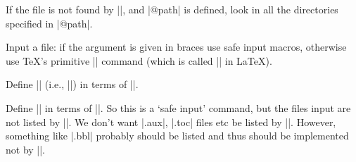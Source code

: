\begin{multicols}
 \begin{macro}{\@iffileonpath}
 \end{macro}
 If the file is not found by |\openin|, and |@path| is defined,
 look in all the directories specified in |@path|.

    \begin{teX}
\long\def\@iffileonpath#1{%
  \let\reserved@a\@secondoftwo
  \expandafter\@tfor\expandafter\reserved@b\expandafter
             :\expandafter=@path\do{%
    \openin\@inputcheck\reserved@b#1 %
    \ifeof\@inputcheck\else
      \edef\@filef@und{\reserved@b#1 }%
      \let\reserved@a\@firstoftwo%
      \closein\@inputcheck
      \@break@tfor
    \fi}%
  \reserved@a}
    \end{teX}



    \begin{teX}
\long{}
    \end{teX}


  \begin{macro}{}
    Input a file: if the argument is given in braces use safe input
    macros, otherwise use \TeX's primitive || command (which is
    called |\@@input| in \LaTeX).
  \end{macro}

    \begin{teX}
\def
    \end{teX}


 \begin{macro}{\@iinput}
    Define |\@iinput| (i.e., ||) in terms of
    |\InputIfIfileExists|.
 \end{macro}
    \begin{teX}
\def\@iinput#1{%
  \InputIfFileExists{#1}{}%
  {\filename@parse{#1}%
   \edef\reserved@a{\noexpand\@missingfileerror
     {\filename@area\filename@base}%
     {\ifx\filename@ext\relax tex\else\filename@ext\fi}}%
   \reserved@a}}
    \end{teX}


 \begin{macro}{\@input}
    Define |\@input| in terms of |\IffileExists|.
    So this is a `safe input' command, but the files input are not
    listed by |\listfiles|.
    We don't want |.aux|, |.toc| files etc be listed by |\listfiles|.
    However, something like |.bbl| probably should be listed and thus
    should be implemented not by |\@input|.
 \end{macro}
    \begin{teX}
\def\@input#1{%
  \IfFileExists{#1}{\@@input\@filef@und}{\typeout{No file #1.}}}
    \end{teX}



\end{multicols}
